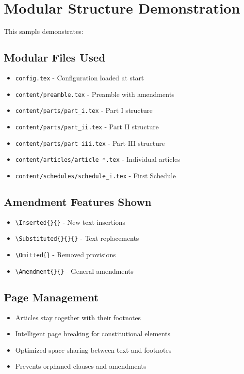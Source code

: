 \documentclass[showamendments]{soi}
\begin{document}
\tableofcontents
\clearpage










\clearpage
\appendix


\clearpage
\section*{Modular Structure Demonstration}

This sample demonstrates:

\subsection*{Modular Files Used}
\begin{itemize}
\item \texttt{config.tex} - Configuration loaded at start
\item \texttt{content/preamble.tex} - Preamble with amendments
\item \texttt{content/parts/part\_i.tex} - Part I structure
\item \texttt{content/parts/part\_ii.tex} - Part II structure  
\item \texttt{content/parts/part\_iii.tex} - Part III structure
\item \texttt{content/articles/article\_*.tex} - Individual articles
\item \texttt{content/schedules/schedule\_i.tex} - First Schedule
\end{itemize}

\subsection*{Amendment Features Shown}
\begin{itemize}
\item \texttt{\textbackslash{}Inserted\{\}\{\}} - New text insertions
\item \texttt{\textbackslash{}Substituted\{\}\{\}\{\}} - Text replacements
\item \texttt{\textbackslash{}Omitted\{\}} - Removed provisions
\item \texttt{\textbackslash{}Amendment\{\}\{\}} - General amendments
\end{itemize}

\subsection*{Page Management}
\begin{itemize}
\item Articles stay together with their footnotes
\item Intelligent page breaking for constitutional elements
\item Optimized space sharing between text and footnotes
\item Prevents orphaned clauses and amendments
\end{itemize}
\end{document}
